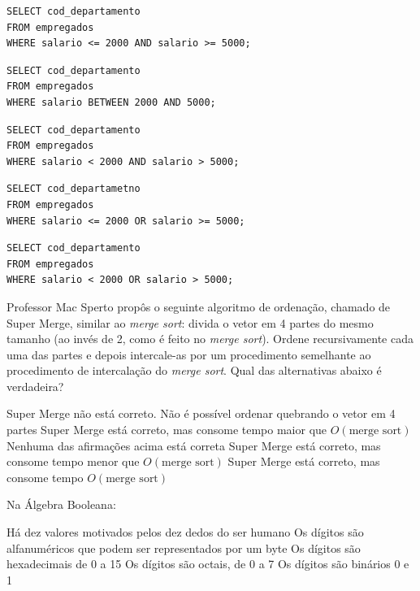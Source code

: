 \documentclass[12pt, addpoints]{exam}
\begin{document}
\begin{questions}
\begin{choices}
\choice \begin{verbatim}SELECT cod_departamento
FROM empregados
WHERE salario <= 2000 AND salario >= 5000;
\end{verbatim}

\choice \begin{verbatim}SELECT cod_departamento
FROM empregados
WHERE salario BETWEEN 2000 AND 5000;
\end{verbatim}

\choice \begin{verbatim}SELECT cod_departamento
FROM empregados
WHERE salario < 2000 AND salario > 5000;
\end{verbatim}

\choice \begin{verbatim}SELECT cod_departametno
FROM empregados
WHERE salario <= 2000 OR salario >= 5000;
\end{verbatim}

\choice \begin{verbatim}SELECT cod_departamento
FROM empregados
WHERE salario < 2000 OR salario > 5000;
\end{verbatim}

\end{choices}

\question
Professor Mac Sperto propôs o seguinte algoritmo de ordenação, chamado de Super Merge, similar ao \textit{merge sort}: divida o vetor em 4 partes do mesmo tamanho (ao invés de 2, como é feito no \textit{merge sort}). Ordene recursivamente cada uma das partes e depois intercale-as por um procedimento semelhante ao procedimento de intercalação do \textit{merge sort}. Qual das alternativas abaixo é verdadeira?
\begin{choices}
\choice Super Merge não está correto. Não é possível ordenar quebrando o vetor em 4 partes
\choice Super Merge está correto, mas consome tempo maior que \( O(\text{merge sort}) \)
\choice Nenhuma das afirmações acima está correta
\choice Super Merge está correto, mas consome tempo menor que \( O(\text{merge sort}) \)
\choice Super Merge está correto, mas consome tempo \( O(\text{merge sort}) \)
\end{choices}

\question
Na Álgebra Booleana:
\begin{choices}
\choice Há dez valores motivados pelos dez dedos do ser humano
\choice Os dígitos são alfanuméricos que podem ser representados por um byte
\choice Os dígitos são hexadecimais de 0 a 15
\choice Os dígitos são octais, de 0 a 7
\choice Os dígitos são binários 0 e 1
\end{choices}


\end{questions}
\end{document}
